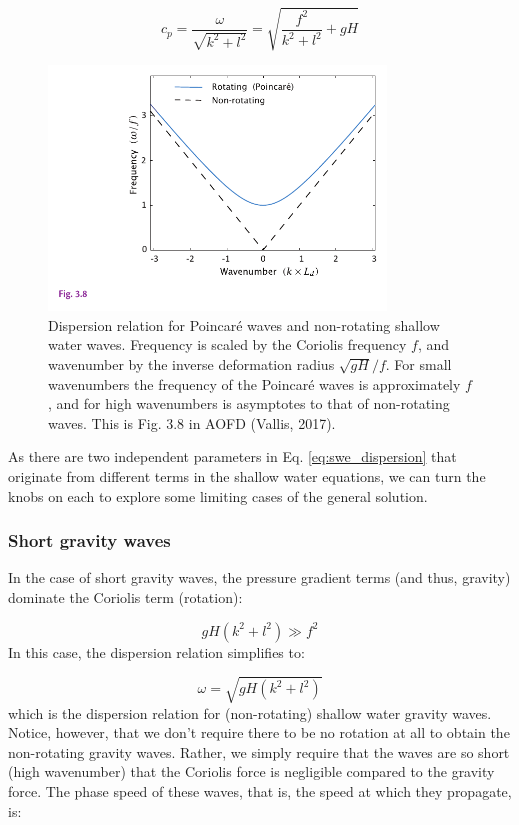 \documentclass[12pt]{article}
\numberwithin{equation}{section}
\numberwithin{figure}{section}
\numberwithin{table}{section}
\begin{document}
\begin{equation}
  c_p = \frac{\omega}{\sqrt{k^2 + l^2}} = \sqrt{\frac{f^2}{k^2 + l^2} + gH}
\end{equation}

\begin{figure}[h]
  \centering
  \includegraphics[width=0.8\textwidth]{assets/fig_swe_dispersion.pdf}
  \caption{
    Dispersion relation for Poincaré waves and non-rotating shallow water
    waves.
    Frequency is scaled by the Coriolis frequency $f$, and wavenumber by the
    inverse deformation radius $\sqrt{gH}/f$.
    For small wavenumbers the frequency of the Poincaré waves is approximately
    $f$, and for high wavenumbers is asymptotes to that of non-rotating waves.
    This is Fig. 3.8 in AOFD (Vallis, 2017).
  }
  \label{fig:swe_dispersion}
\end{figure}

As there are two independent parameters in Eq. \ref{eq:swe_dispersion} that
originate from different terms in the shallow water equations, we can turn the
knobs on each to explore some limiting cases of the general solution.

\subsubsection{Short gravity waves}

In the case of short gravity waves, the pressure gradient terms (and thus,
gravity) dominate the Coriolis term (rotation):

\begin{equation}
  gH(k^2 + l^2) \gg f^2
\end{equation}
In this case, the dispersion relation simplifies to:

\begin{equation}
  \omega = \sqrt{gH(k^2 + l^2)}
\end{equation}
which is the dispersion relation for (non-rotating) shallow water gravity waves.
Notice, however, that we don't require there to be no rotation at all to obtain
the non-rotating gravity waves.
Rather, we simply require that the waves are so short (high wavenumber) that the
Coriolis force is negligible compared to the gravity force.
The phase speed of these waves, that is, the speed at which they propagate, is:
\end{document}
